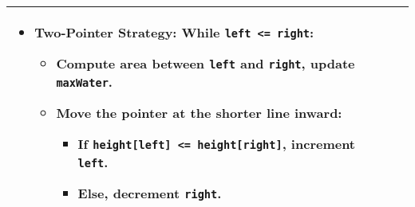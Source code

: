 \begin{summary}
\begin{center}
\begin{tabular}{ll}
{\begin{itemize}
                    \item \textbf{Two-Pointer Strategy:} \textbf{While} \texttt{left <= right}:
                    \begin{itemize}
                        \item Compute area between \texttt{left} and \texttt{right}, update \texttt{maxWater}.
                        \item Move the pointer at the shorter line inward:
                        \begin{itemize}
                            \item If \texttt{height[left] <= height[right]}, increment \texttt{left}.
                            \item Else, decrement \texttt{right}.
                        \end{itemize}
                    \end{itemize}
                \end{itemize}                
            } \\
            \bottomrule
        \end{tabular}
    \end{center}
\end{summary}
\newpage


